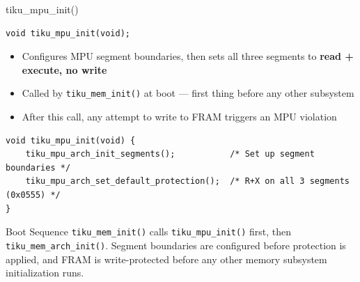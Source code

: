 \documentclass[aspectratio=169, 10pt]{beamer}
\begin{document}
\begin{frame}[fragile]{tiku\_mpu\_init()}
\begin{lstlisting}[style=cstyle]
void tiku_mpu_init(void);
\end{lstlisting}

\begin{itemize}
  \item Configures MPU segment boundaries, then sets all three segments to \textbf{read + execute, no write}
  \item Called by \texttt{tiku\_mem\_init()} at boot --- first thing before any other subsystem
  \item After this call, any attempt to write to FRAM triggers an MPU violation
\end{itemize}

\vspace{0.3em}
\begin{lstlisting}[style=cstyle, title={kernel/memory/tiku\_mpu.c}]
void tiku_mpu_init(void) {
    tiku_mpu_arch_init_segments();           /* Set up segment boundaries */
    tiku_mpu_arch_set_default_protection();  /* R+X on all 3 segments (0x0555) */
}
\end{lstlisting}

\vspace{0.3em}
\begin{block}{Boot Sequence}
\texttt{tiku\_mem\_init()} calls \texttt{tiku\_mpu\_init()} first, then
\texttt{tiku\_mem\_arch\_init()}. Segment boundaries are configured before
protection is applied, and FRAM is write-protected before any other
memory subsystem initialization runs.
\end{block}
\end{frame}
\end{document}
